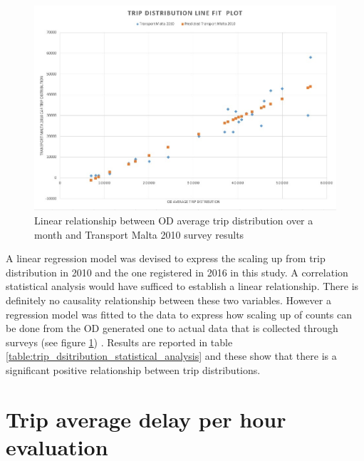 \documentclass[12pt, a4paper]{report}
\theoremstyle{definition}
\theoremstyle{definition}%
\theoremstyle{definition}%
\theoremstyle{definition}%
\theoremstyle{definition}%
\theoremstyle{definition}%
\begin{document}
\begin{figure}[!]	
	\includegraphics[scale=0.5]{Trip_distribution_line_fit_plot.jpg}
	\centering
	\caption[NHTS and OD average trip distribution linear relationship]{Linear relationship between OD average trip distribution over a month and Transport Malta 2010 survey results \cite{malta2011national}}
	\label{fig:trip_count_correlation_model}
\end{figure}

A linear regression model was devised to express the scaling up from trip distribution in 2010 and the one registered in 2016 in this study. A correlation statistical analysis would have sufficed to establish a linear relationship. There is definitely no causality relationship between these two variables. However a regression model was fitted to the data to express how scaling up of counts can be done from the OD generated one to actual data that is collected through surveys (see figure \ref{fig:trip_count_correlation_model}) . Results are reported in table \ref{table:trip_dsitribution_statistical_analysis} and these show that there is a significant positive relationship between trip distributions.


\section{Trip average delay per hour evaluation} \label{section:trip_average_delay_evaluation}
\end{document}
